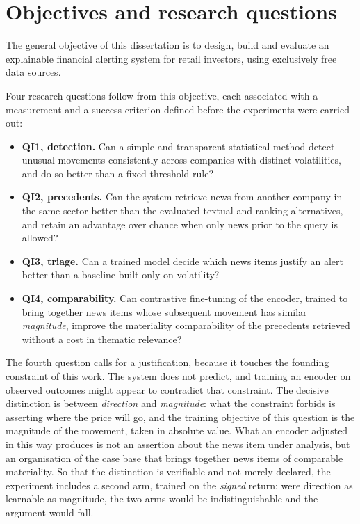 \section{Objectives and research questions}
\label{sec:intro_objetivos}

The general objective of this dissertation is to design, build and evaluate an explainable
financial alerting system for retail investors, using exclusively free data sources.

Four research questions follow from this objective, each associated with a measurement and a
success criterion defined before the experiments were carried out:
\begin{itemize}
  \item \textbf{\gls{QI}1, detection.} Can a simple and transparent statistical method detect
        unusual movements consistently across companies with distinct volatilities, and do so
        better than a fixed threshold rule?
  \item \textbf{\gls{QI}2, precedents.} Can the system retrieve news from another company in
        the same sector better than the evaluated textual and ranking alternatives, and retain
        an advantage over chance when only news prior to the query is allowed?
  \item \textbf{\gls{QI}3, triage.} Can a trained model decide which news items justify an alert
        better than a baseline built only on volatility?
  \item \textbf{\gls{QI}4, comparability.} Can contrastive fine-tuning of the encoder, trained to
        bring together news items whose subsequent movement has similar \emph{magnitude}, improve
        the materiality comparability of the precedents retrieved without a cost in thematic
        relevance?
\end{itemize}

The fourth question calls for a justification, because it touches the founding constraint of this
work. The system does not predict, and training an encoder on observed outcomes might appear to
contradict that constraint. The decisive distinction is between \emph{direction} and
\emph{magnitude}: what the constraint forbids is asserting where the price will go, and the
training objective of this question is the magnitude of the movement, taken in absolute value.
What an encoder adjusted in this way produces is not an assertion about the news item under
analysis, but an organisation of the case base that brings together news items of comparable
materiality. So that the distinction is verifiable and not merely declared, the experiment
includes a second arm, trained on the \emph{signed} return: were direction as learnable as
magnitude, the two arms would be indistinguishable and the argument would fall.

